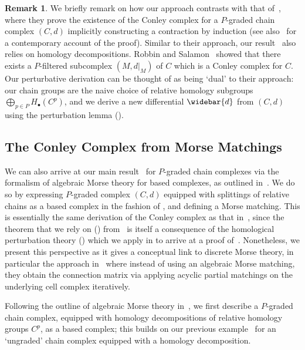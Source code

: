 \documentclass[11pt, table, nothms]{amsart}
\theoremstyle{definition}
\newtheorem{remark}[theorem]{Remark}
\newcommand{\od}{\widebar{d}}
\begin{document}
{\begin{remark} \label{rmk:novelty}
We briefly remark on how our approach contrasts with that of~\cite[Theorem~8.1]{Robbin1992LyapunovFunctor}, where they prove the existence of the Conley complex for a $P$-graded chain complex $(C,d)$ implicitly constructing a contraction by induction (see also~\cite[Theorem 5.3.2]{Mrozek2025ConnectionDynamics} for a contemporary account of the proof). Similar to their approach, our result~ also relies on homology decompositions. 
Robbin and Salamon~\cite{Robbin1992LyapunovFunctor,Mrozek2025ConnectionDynamics} 
showed that there exists a $P$-filtered subcomplex $(M, d\rvert_M)$ of $C$ which is a Conley complex for $C$. 
Our perturbative derivation can be thought of as being `dual' to their approach: our chain groups are the naive choice of relative homology subgroups $\bigoplus_{p \in P} H_\bullet(C^p)$, and we derive a new differential $\od$ from $(C,d)$ using the perturbation lemma (). 
\end{remark}

\subsection{The Conley Complex from Morse Matchings} \label{ssec:conley_amt}
We can also arrive at our main result~ for $P$-graded chain complexes via the formalism of algebraic Morse theory for based complexes, as outlined in~. We do so by expressing $P$-graded complex $(C,d)$ equipped with splittings of relative chains as a based complex in the fashion of , and defining a Morse matching. This is essentially the same derivation of the Conley complex as that in~, since the theorem that we rely on () from~\cite{Skoldberg2006MorseViewpoint, Skoldberg2018} is itself a consequence of the homological perturbation theory () which we apply in  to arrive at a proof of~. Nonetheless, we present this perspective as it gives a conceptual link to discrete Morse theory, in particular the approach in~\cite{harker2021} where instead of using an algebraic Morse matching, they obtain the connection matrix via applying acyclic partial matchings on the underlying cell complex iteratively. 

Following the outline of algebraic Morse theory in~, we first describe a $P$-graded chain complex, equipped with homology decompositions of relative homology groups $C^p$, as a based complex; this builds on our previous example~ for an `ungraded' chain complex equipped with a homology decomposition. 

}
\end{document}
